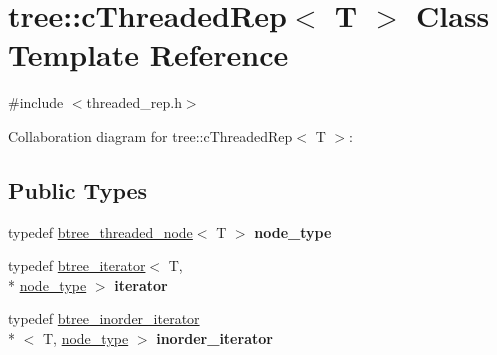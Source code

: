 \hypertarget{classtree_1_1cThreadedRep}{\section{tree\-:\-:c\-Threaded\-Rep$<$ T $>$ Class Template Reference}
\label{classtree_1_1cThreadedRep}
}


{\ttfamily \#include $<$threaded\-\_\-rep.\-h$>$}



Collaboration diagram for tree\-:\-:c\-Threaded\-Rep$<$ T $>$\-:
\subsection*{Public Types}
\begin{DoxyCompactItemize}
\item 
\hypertarget{classtree_1_1cThreadedRep_aa2df7e02a980552a4a16e4c669049654}{typedef \hyperlink{structtree_1_1btree__threaded__node}{btree\-\_\-threaded\-\_\-node}$<$ T $>$ {\bfseries node\-\_\-type}}\label{classtree_1_1cThreadedRep_aa2df7e02a980552a4a16e4c669049654}

\item 
\hypertarget{classtree_1_1cThreadedRep_ac9f5a3607794b24b7cda7d2288ce2cc8}{typedef \hyperlink{classtree_1_1btree__iterator}{btree\-\_\-iterator}$<$ T, \\*
\hyperlink{structtree_1_1btree__threaded__node}{node\-\_\-type} $>$ {\bfseries iterator}}\label{classtree_1_1cThreadedRep_ac9f5a3607794b24b7cda7d2288ce2cc8}

\item 
\hypertarget{classtree_1_1cThreadedRep_aec013eb2bc9a327239d1366f039ed94e}{typedef \hyperlink{classtree_1_1btree__inorder__iterator}{btree\-\_\-inorder\-\_\-iterator}\\*
$<$ T, \hyperlink{structtree_1_1btree__threaded__node}{node\-\_\-type} $>$ {\bfseries inorder\-\_\-iterator}}\label{classtree_1_1cThreadedRep_aec013eb2bc9a327239d1366f039ed94e}

\end{DoxyCompactItemize}
